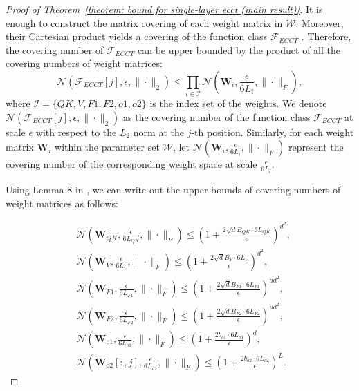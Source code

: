\documentclass[lettersize,onecolumn]{IEEEtran}
\begin{document}
\begin{proof}[Proof of Theorem~\ref{theorem: bound for single-layer ecct (main result)}]
It is enough to construct the matrix covering of each weight matrix in $\mathcal{W}$. Moreover, their Cartesian product yields a covering of the function class $\mathcal{F}_{ECCT}$ \cite{chen2020generalizationofafamilyofRNN,edelman2022inductivebiasTransformerGeneralization}. Therefore, the covering number of  $\mathcal{F}_{ECCT}$ can be upper bounded by the product of all the covering numbers of weight matrices\cite{bartlett2017spectrallynormalizedmarginbounds}:
\begin{equation}
        \mathcal{N}(\mathcal{F}_{ECCT}[j],\epsilon,\|\cdot\|_{2}) \leq \prod_{i\in \mathcal{I}} \mathcal{N}(\mathbf{W}_{i},\frac{\epsilon}{6L_{i}},\|\cdot\|_{F}), 
        \label{eq: global covering number upper bound (prod)}
\end{equation}
where $\mathcal{I}=\{Q K, V, F 1, F 2, o 1, o 2\}$ is the index set of the weights. We denote $\mathcal{N}(\mathcal{F}_{ECCT}[j],\epsilon,\|\cdot\|_{2})$ as the covering number of the function class $\mathcal{F}_{ECCT}$ at scale $\epsilon$ with respect to the $L_2$ norm at the $j$-th position. Similarly, for each weight matrix $\mathbf{W}_{i}$ within the parameter set $\mathcal{W}$, let $ \mathcal{N}(\mathbf{W}_{i},\frac{\epsilon}{6L_{i}},\|\cdot\|_{F})$ represent the covering number of the corresponding weight space at scale $\frac{\epsilon}{6L_{i}}$.

Using Lemma 8 in \cite{chen2020generalizationofafamilyofRNN}, we can write out the upper bounds of covering numbers of weight matrices as follows:

\begin{align}
    &\mathcal{N}\left(\mathbf{W}_{QK}, \frac{\epsilon}{6 L_{QK}}, \| \cdot \|_{F}\right) \leq\left(1+\frac{2 \sqrt{d} B_{QK} \cdot 6 L_{QK}}{\epsilon}\right)^{d^{2}},\label{eq: covering number of QK}\\
    &\mathcal{N}\left(\mathbf{W}_{V}, \frac{\epsilon}{6 L_{V}}, \| \cdot \|_{F}\right) \leq\left(1+\frac{2 \sqrt{d} B_{V} \cdot 6 L_{V}}{\epsilon}\right)^{d^{2}},\\
    &\mathcal{N}\left(\mathbf{W}_{F1}, \frac{\epsilon}{6 L_{F1}}, \| \cdot \|_{F}\right) \leq\left(1+\frac{2 \sqrt{d} B_{F1} \cdot 6 L_{F1}}{\epsilon}\right)^{ud^{2}}, \\
    &\mathcal{N}\left(\mathbf{W}_{F2}, \frac{\epsilon}{6 L_{F2}}, \| \cdot \|_{F}\right) \leq\left(1+\frac{2 \sqrt{d} B_{F2} \cdot 6 L_{F2}}{\epsilon}\right)^{ud^{2}},\\
    &\mathcal{N}\left(\mathbf{W}_{o1}, \frac{\epsilon}{6 L_{o1}}, \| \cdot \|_{F}\right) \leq\left(1+\frac{2 b_{o1} \cdot 6 L_{o1}}{\epsilon}\right)^{d}, \label{eq: covering number of o1}\\
    &\mathcal{N}\left(\mathbf{W}_{o2}[:,j], \frac{\epsilon}{6 L_{o2}}, \| \cdot \|_{F}\right) \leq\left(1+\frac{2 b_{o2} \cdot 6 L_{o2}}{\epsilon}\right)^{L}.\label{eq: covering number of o2}
\end{align}


\end{proof}
\end{document}
